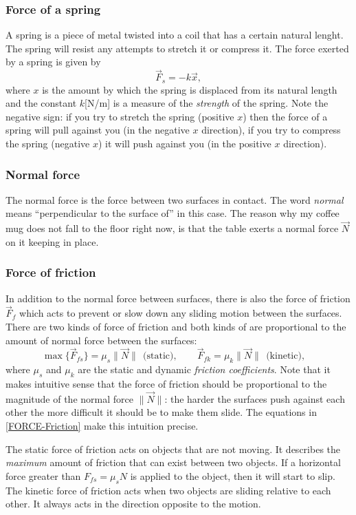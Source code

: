 \documentclass[letterpaper,9pt,journal]{IEEEtran}
\newcommand{\dokuitalic}[1]{\textsl{#1}}
\newcommand{\be}{\begin{equation}}
\newcommand{\ee}{\end{equation}}
\begin{document}
\subsubsection{Force of a spring}
A spring is a piece of metal twisted into a coil that has a certain natural lenght.
The spring will resist any attempts to stretch it or compress it.
The force exerted by a spring is given by
\be
 \vec{F}_s=-k\vec{x},
  \label{FORCE-Spring}
\ee
where $x$ is the amount by which the spring is displaced from its natural length
and the constant $k$[N/m] is a measure of the  \dokuitalic{strength} of the spring.
Note the negative sign: if you try to stretch the spring (positive $x$) then the force
of a spring will pull against you (in the negative $x$ direction),
if you try to compress the spring (negative $x$) it will push against you (in the positive $x$ direction).


\subsubsection{Normal force}
The normal force is the force between two surfaces in contact. 
The word \emph{normal} means ``perpendicular to the surface of'' in this case.
The reason why my coffee mug does not fall to the floor right now, 
is that the table exerts a normal force $\vec{N}$ on it keeping in place.


\subsubsection{Force of friction}

In addition to the normal force between surfaces, there is also the force of
friction $\vec{F}_f$ which acts to prevent or slow down any sliding motion between the surfaces.
There are two kinds of force of friction and both kinds of are proportional to the amount of 
normal force between the surfaces:
\be
  \max \{ \vec{F}_{fs} \}=\mu_s\|\vec{N}\| \ \ \text{(static)}, \qquad \vec{F}_{fk}=\mu_k\|\vec{N}\| \ \ \text{(kinetic)},
 \quad  \label{FORCE-Friction}
\ee
where $\mu_s$ and $\mu_k$ are the static and dynamic \emph{friction coefficients}.
Note that it makes intuitive sense that the force of friction should be proportional to the
magnitude of the normal force $\|\vec{N}\|$: the harder the surfaces push against each
other the more difficult it should be to make them slide. 
The equations in \eqref{FORCE-Friction} make this intuition precise.

The static force of friction acts on objects that are not moving.
It describes the \emph{maximum} amount of friction that  can exist between two objects. 
If a horizontal force greater than $F_{fs} = \mu_s N$ is applied to the object, 
then it will start to slip.
The kinetic force of friction acts when two objects are sliding relative to each other. 
It always acts in the direction opposite to the motion. 
\end{document}

